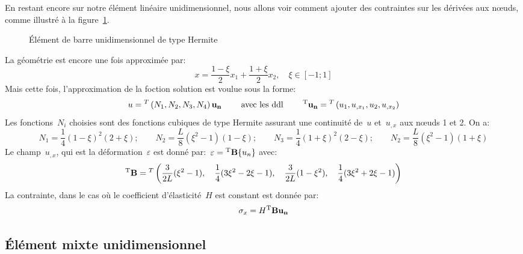En restant encore sur notre élément linéaire unidimensionnel, nous allons voir comment ajouter des
contraintes sur les dérivées aux nœuds, comme illustré à la figure~\ref{fig-ex2Her}.
\begin{figure}[ht]\centering
{} \hspace{5em}
\caption{Élément de barre unidimensionnel de type Hermite}\label{fig-ex2Her}
\end{figure}
\medskipvm
La géométrie est encore une fois approximée par:
\begin{equation} x=\frac{1-\xi}2 x_1 + \frac{1+\xi}2 x_2, \quad \xi\in[-1;1] \end{equation}
\medskipvm
Mais cette fois, l'approximation de la foction solution est voulue sous la forme:
\begin{equation}
u = \LLL{N_1, N_2, N_3, N_4}\VV{u_n} \qquad \text{ avec les ddl } \qquad
\LL{u_n}=\LLL{u_1, u_{,x_1}, u_2, u_{,x_2}} 
\end{equation}
\medskipvm
Les fonctions~$N_i$ choisies sont des fonctions cubiques de type Hermite assurant une continuité
de~$u$ et~$u_{,x}$ aux nœuds 1 et 2. On a:
\begin{equation}
N_1=\frac14(1-\xi)^2(2+\xi); \qquad
N_2=\frac{L}8(\xi^2-1)(1-\xi); \qquad
N_3=\frac14(1+\xi)^2(2-\xi); \qquad
N_2=\frac{L}8(\xi^2-1)(1+\xi)
\end{equation}
\medskipvm
Le champ~$u_{,x}$, qui est la déformation~$\varepsilon$ est donné par:~$\varepsilon={}^\mathrm{T}\mathbf{B}\{u_n\}$ avec:
\begin{equation} {}^\mathrm{T}\mathbf{B}={}^T\left( \frac3{2L}(\xi^2-1), \quad \frac14(3\xi^2-2\xi-1), \quad \frac3{2L}(1-\xi^2), \quad
\frac14(3\xi^2+2\xi-1)\right)\end{equation}
\medskipvm
La contrainte, dans le cas où le coefficient d'élasticité~$H$ est constant est
donnée par:
\begin{equation}\sigma_x=H \LL{B}\VV{u_n}\end{equation}
\medskipvm
\subsection{Élément mixte unidimensionnel}

